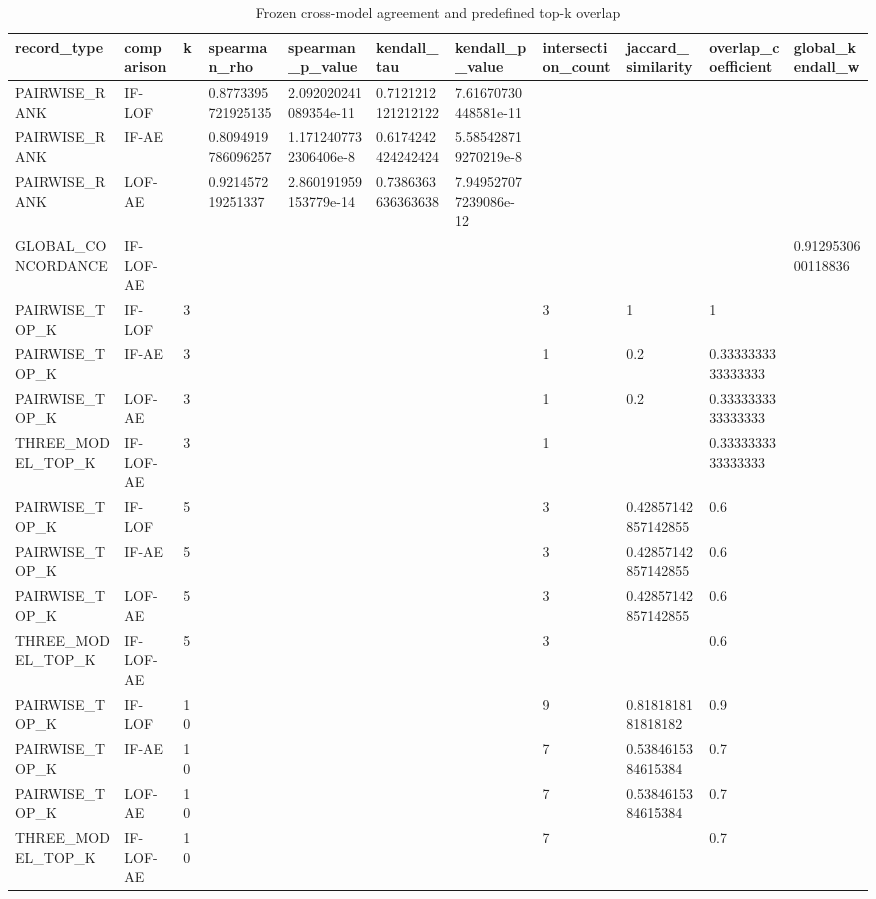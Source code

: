 \begin{longtable}{lllllllllll}
\caption{Frozen cross-model agreement and predefined top-k overlap}\\
\hline
record\_type & comparison & k & spearman\_rho & spearman\_p\_value & kendall\_tau & kendall\_p\_value & intersection\_count & jaccard\_similarity & overlap\_coefficient & global\_kendall\_w \\
\hline
PAIRWISE\_RANK & IF-LOF &  & 0.8773395721925135 & 2.092020241089354e-11 & 0.7121212121212122 & 7.61670730448581e-11 &  &  &  &  \\
PAIRWISE\_RANK & IF-AE &  & 0.8094919786096257 & 1.1712407732306406e-8 & 0.6174242424242424 & 5.585428719270219e-8 &  &  &  &  \\
PAIRWISE\_RANK & LOF-AE &  & 0.921457219251337 & 2.860191959153779e-14 & 0.7386363636363638 & 7.949527077239086e-12 &  &  &  &  \\
GLOBAL\_CONCORDANCE & IF-LOF-AE &  &  &  &  &  &  &  &  & 0.9129530600118836 \\
PAIRWISE\_TOP\_K & IF-LOF & 3 &  &  &  &  & 3 & 1 & 1 &  \\
PAIRWISE\_TOP\_K & IF-AE & 3 &  &  &  &  & 1 & 0.2 & 0.3333333333333333 &  \\
PAIRWISE\_TOP\_K & LOF-AE & 3 &  &  &  &  & 1 & 0.2 & 0.3333333333333333 &  \\
THREE\_MODEL\_TOP\_K & IF-LOF-AE & 3 &  &  &  &  & 1 &  & 0.3333333333333333 &  \\
PAIRWISE\_TOP\_K & IF-LOF & 5 &  &  &  &  & 3 & 0.42857142857142855 & 0.6 &  \\
PAIRWISE\_TOP\_K & IF-AE & 5 &  &  &  &  & 3 & 0.42857142857142855 & 0.6 &  \\
PAIRWISE\_TOP\_K & LOF-AE & 5 &  &  &  &  & 3 & 0.42857142857142855 & 0.6 &  \\
THREE\_MODEL\_TOP\_K & IF-LOF-AE & 5 &  &  &  &  & 3 &  & 0.6 &  \\
PAIRWISE\_TOP\_K & IF-LOF & 10 &  &  &  &  & 9 & 0.8181818181818182 & 0.9 &  \\
PAIRWISE\_TOP\_K & IF-AE & 10 &  &  &  &  & 7 & 0.5384615384615384 & 0.7 &  \\
PAIRWISE\_TOP\_K & LOF-AE & 10 &  &  &  &  & 7 & 0.5384615384615384 & 0.7 &  \\
THREE\_MODEL\_TOP\_K & IF-LOF-AE & 10 &  &  &  &  & 7 &  & 0.7 &  \\
\hline
\end{longtable}

